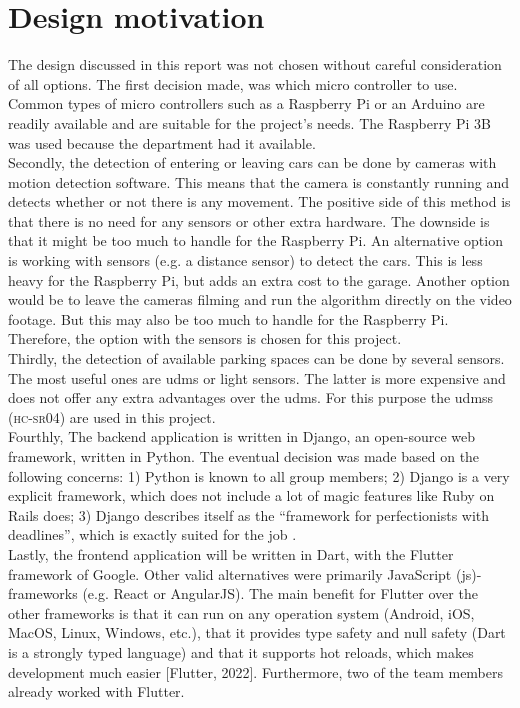 \section{Design motivation}\label{sec:design-motivation}
The design discussed in this report was not chosen without careful consideration of all options. The first decision made, was which micro controller to use. Common types of micro controllers such as a Raspberry Pi or an Arduino are readily available and are suitable for the project's needs. The Raspberry Pi 3B was used because the department had it available. \\

Secondly, the detection of entering or leaving cars can be done by cameras with motion detection software. This means that the camera is constantly running and detects whether or not there is any movement. The positive side of this method is that there is no need for any sensors or other extra hardware. The downside is that it might be too much to handle for the Raspberry Pi. An alternative option is working with sensors (e.g. a distance sensor) to detect the cars. This is less heavy for the Raspberry Pi, but adds an extra cost to the garage. Another option would be to leave the cameras filming and run the algorithm directly on the video footage. But this may also be too much to handle for the Raspberry Pi. Therefore, the option with the sensors is chosen for this project. \\

Thirdly, the detection of available parking spaces can be done by several sensors. The most useful ones are \ac{udms} or light sensors. The latter is more expensive and does not offer any extra advantages over the \ac{udms}. For this purpose the \acp{udms} (\textsc{hc-sr04}) are used in this project.\\

Fourthly, The backend application is written in Django, an open-source web framework, written in Python. The eventual decision was made based on the following concerns: 1) Python is known to all group members; 2) Django is a very explicit framework, which does not include a lot of magic features like Ruby on Rails does; 3) Django describes itself as the ``framework for perfectionists with deadlines'', which is exactly suited for the job \cite{django_website}. \\

Lastly, the frontend application will be written in Dart, with the Flutter framework of Google. Other valid alternatives were primarily JavaScript (\ac{js})-frameworks (e.g. React or AngularJS). The main benefit for Flutter
over the other frameworks is that it can run on any operation system (Android, iOS, MacOS, Linux, Windows,
etc.), that it provides type safety and null safety (Dart is a strongly typed language) and that it supports
hot reloads, which makes development much easier [Flutter, 2022]. Furthermore, two of the team members
already worked with Flutter. \\

